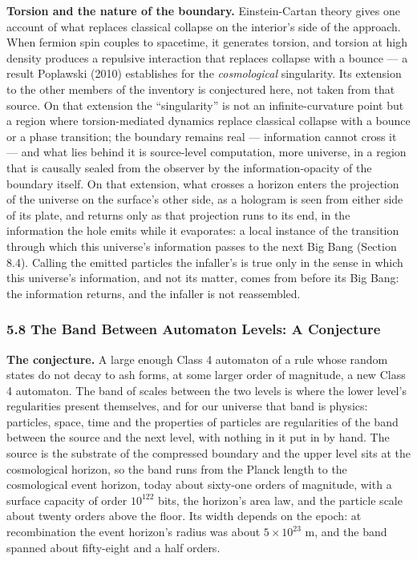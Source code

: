 \documentclass[
]{article}
\begin{document}
\textbf{Torsion and the nature of the boundary.} Einstein-Cartan theory
gives one account of what replaces classical collapse on the interior's
side of the approach. When fermion spin couples to spacetime, it
generates torsion, and torsion at high density produces a repulsive
interaction that replaces collapse with a bounce --- a result Poplawski
(2010) establishes for the \emph{cosmological} singularity. Its
extension to the other members of the inventory is conjectured here, not
taken from that source. On that extension the ``singularity'' is not an
infinite-curvature point but a region where torsion-mediated dynamics
replace classical collapse with a bounce or a phase transition; the
boundary remains real --- information cannot cross it --- and what lies
behind it is source-level computation, more universe, in a region that
is causally sealed from the observer by the information-opacity of the
boundary itself. On that extension, what crosses a horizon enters the
projection of the universe on the surface's other side, as a hologram is
seen from either side of its plate, and returns only as that projection
runs to its end, in the information the hole emits while it evaporates:
a local instance of the transition through which this universe's
information passes to the next Big Bang (Section 8.4). Calling the
emitted particles the infaller's is true only in the sense in which this
universe's information, and not its matter, comes from before its Big
Bang: the information returns, and the infaller is not reassembled.

\hypertarget{the-band-between-automaton-levels-a-conjecture}{%
\subsubsection{5.8 The Band Between Automaton Levels: A
Conjecture}\label{the-band-between-automaton-levels-a-conjecture}}

\textbf{The conjecture.} A large enough Class 4 automaton of a rule
whose random states do not decay to ash forms, at some larger order of
magnitude, a new Class 4 automaton. The band of scales between the two
levels is where the lower level's regularities present themselves, and
for our universe that band is physics: particles, space, time and the
properties of particles are regularities of the band between the source
and the next level, with nothing in it put in by hand. The source is the
substrate of the compressed boundary and the upper level sits at the
cosmological horizon, so the band runs from the Planck length to the
cosmological event horizon, today about sixty-one orders of magnitude,
with a surface capacity of order \(10^{122}\) bits, the horizon's area
law, and the particle scale about twenty orders above the floor. Its
width depends on the epoch: at recombination the event horizon's radius
was about \(5 \times 10^{23}\) m, and the band spanned about fifty-eight
and a half orders.
\end{document}
